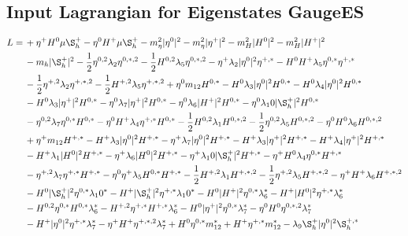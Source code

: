 \subsection{Input Lagrangian for Eigenstates GaugeES} 
\begin{align} 
L = \, & +\eta^+ H^0 \mu \S_h^+ - \eta^0 H^+ \mu \S_h^+ - m_\eta^2 |\eta^0|^2 - m_\eta^2 |\eta^+|^2 - m_H^2 |H^0|^2 - m_H^2 |H^+|^2 \nonumber \\ 
 &- m_h |\S_h^+|^2 -\frac{1}{2} \eta^{0,2} \lambda_2 \eta^{0,*,2} -\frac{1}{2} H^{0,2} \lambda_5 \eta^{0,*,2} - \eta^+ \lambda_2 |\eta^0|^2 \eta^{+,*} - H^0 H^+ \lambda_5 \eta^{0,*} \eta^{+,*} \nonumber \\ 
 &-\frac{1}{2} \eta^{+,2} \lambda_2 \eta^{+,*,2} -\frac{1}{2} H^{+,2} \lambda_5 \eta^{+,*,2} +\eta^0 m_{12} H^{0,*} - H^0 \lambda_3 |\eta^0|^2 H^{0,*} - H^0 \lambda_4 |\eta^0|^2 H^{0,*} \nonumber \\ 
 &- H^0 \lambda_3 |\eta^+|^2 H^{0,*} - \eta^0 \lambda_7 |\eta^+|^2 H^{0,*} - \eta^0 \lambda_6 |H^+|^2 H^{0,*} - \eta^0 \lambda_10 |\S_h^+|^2 H^{0,*} \nonumber \\ 
 &- \eta^{0,2} \lambda_7 \eta^{0,*} H^{0,*} - \eta^0 H^+ \lambda_4 \eta^{+,*} H^{0,*} -\frac{1}{2} H^{0,2} \lambda_1 H^{0,*,2} -\frac{1}{2} \eta^{0,2} \lambda_5 H^{0,*,2} - \eta^0 H^0 \lambda_6 H^{0,*,2} \nonumber \\ 
 &+\eta^+ m_{12} H^{+,*} - H^+ \lambda_3 |\eta^0|^2 H^{+,*} - \eta^+ \lambda_7 |\eta^0|^2 H^{+,*} - H^+ \lambda_3 |\eta^+|^2 H^{+,*} - H^+ \lambda_4 |\eta^+|^2 H^{+,*} \nonumber \\ 
 &- H^+ \lambda_1 |H^0|^2 H^{+,*} - \eta^+ \lambda_6 |H^0|^2 H^{+,*} - \eta^+ \lambda_10 |\S_h^+|^2 H^{+,*} - \eta^+ H^0 \lambda_4 \eta^{0,*} H^{+,*} \nonumber \\ 
 &- \eta^{+,2} \lambda_7 \eta^{+,*} H^{+,*} - \eta^0 \eta^+ \lambda_5 H^{0,*} H^{+,*} -\frac{1}{2} H^{+,2} \lambda_1 H^{+,*,2} -\frac{1}{2} \eta^{+,2} \lambda_5 H^{+,*,2} - \eta^+ H^+ \lambda_6 H^{+,*,2} \nonumber \\ 
 &- H^0 |\S_h^+|^2 \eta^{0,*} \lambda_10^* - H^+ |\S_h^+|^2 \eta^{+,*} \lambda_10^* - H^0 |H^+|^2 \eta^{0,*} \lambda_6^* - H^+ |H^0|^2 \eta^{+,*} \lambda_6^* \nonumber \\ 
 &- H^{0,2} \eta^{0,*} H^{0,*} \lambda_6^* - H^{+,2} \eta^{+,*} H^{+,*} \lambda_6^* - H^0 |\eta^+|^2 \eta^{0,*} \lambda_7^* - \eta^0 H^0 \eta^{0,*,2} \lambda_7^* \nonumber \\ 
 &- H^+ |\eta^0|^2 \eta^{+,*} \lambda_7^* - \eta^+ H^+ \eta^{+,*,2} \lambda_7^* +H^0 \eta^{0,*} m_{12}^* +H^+ \eta^{+,*} m_{12}^* - \lambda_9 \S_h^+ |\eta^0|^2 \S_h^{+,*} \nonumber \\ 

\end{align}
